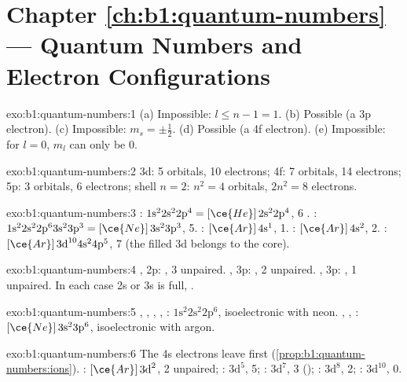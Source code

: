 \section*{Chapter \ref{ch:b1:quantum-numbers} --- Quantum Numbers and Electron Configurations}

\begin{solution}{exo:b1:quantum-numbers:1}
(a) Impossible: $l \le n - 1 = 1$. (b) Possible (a 3p electron).
(c) Impossible: $m_s = \pm\tfrac12$. (d) Possible (a 4f electron).
(e) Impossible: for $l = 0$, $m_l$ can only be 0.
\end{solution}

\begin{solution}{exo:b1:quantum-numbers:2}
3d: 5 orbitals, 10 electrons; 4f: 7 orbitals, 14 electrons; 5p: 3
orbitals, 6 electrons; shell $n = 2$: $n^2 = 4$ orbitals, $2n^2 = 8$
electrons.
\end{solution}

\begin{solution}{exo:b1:quantum-numbers:3}
: $1\text{s}^2 2\text{s}^2 2\text{p}^4 = [\ce{He}]\,2\text{s}^2 2\text{p}^4$,
6 . : $1\text{s}^2 2\text{s}^2 2\text{p}^6 3\text{s}^2
3\text{p}^3 = [\ce{Ne}]\,3\text{s}^2 3\text{p}^3$, 5. : $[\ce{Ar}]\,4\text{s}^1$,
1. : $[\ce{Ar}]\,4\text{s}^2$, 2. : $[\ce{Ar}]\,3\text{d}^{10}
4\text{s}^2 4\text{p}^5$, 7 (the filled 3d belongs to the core).
\end{solution}

\begin{solution}{exo:b1:quantum-numbers:4}
, 2p: , 3 unpaired. , 3p: , 2
unpaired. , 3p: , 1 unpaired. In each case 2s or
3s is full, .
\end{solution}

\begin{solution}{exo:b1:quantum-numbers:5}
, , , , : $1\text{s}^2
2\text{s}^2 2\text{p}^6$, isoelectronic with neon. , ,
: $[\ce{Ne}]\,3\text{s}^2 3\text{p}^6$, isoelectronic with
argon.
\end{solution}

\begin{solution}{exo:b1:quantum-numbers:6}
The 4s electrons leave first (\cref{prop:b1:quantum-numbers:ions}).
: $[\ce{Ar}]\,3\text{d}^2$, 2 unpaired; :
$3\text{d}^5$, 5; : $3\text{d}^7$, 3 ();
: $3\text{d}^8$, 2; : $3\text{d}^{10}$, 0.
\end{solution}

